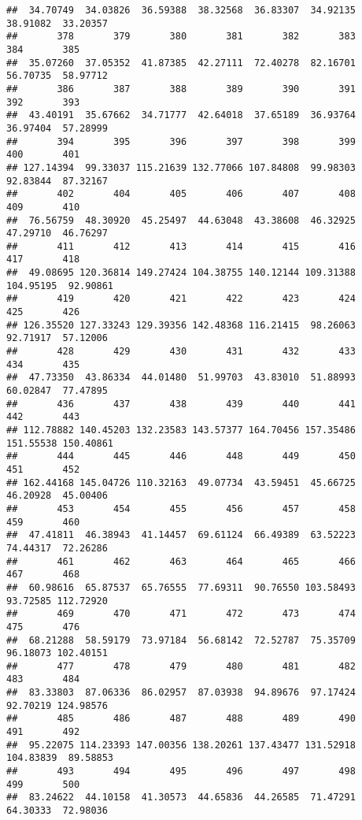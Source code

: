 \documentclass[
]{article}
\begin{document}
\begin{verbatim}
##  34.70749  34.03826  36.59388  38.32568  36.83307  34.92135  38.91082  33.20357 
##       378       379       380       381       382       383       384       385 
##  35.07260  37.05352  41.87385  42.27111  72.40278  82.16701  56.70735  58.97712 
##       386       387       388       389       390       391       392       393 
##  43.40191  35.67662  34.71777  42.64018  37.65189  36.93764  36.97404  57.28999 
##       394       395       396       397       398       399       400       401 
## 127.14394  99.33037 115.21639 132.77066 107.84808  99.98303  92.83844  87.32167 
##       402       404       405       406       407       408       409       410 
##  76.56759  48.30920  45.25497  44.63048  43.38608  46.32925  47.29710  46.76297 
##       411       412       413       414       415       416       417       418 
##  49.08695 120.36814 149.27424 104.38755 140.12144 109.31388 104.95195  92.90861 
##       419       420       421       422       423       424       425       426 
## 126.35520 127.33243 129.39356 142.48368 116.21415  98.26063  92.71917  57.12006 
##       428       429       430       431       432       433       434       435 
##  47.73350  43.86334  44.01480  51.99703  43.83010  51.88993  60.02847  77.47895 
##       436       437       438       439       440       441       442       443 
## 112.78882 140.45203 132.23583 143.57377 164.70456 157.35486 151.55538 150.40861 
##       444       445       446       448       449       450       451       452 
## 162.44168 145.04726 110.32163  49.07734  43.59451  45.66725  46.20928  45.00406 
##       453       454       455       456       457       458       459       460 
##  47.41811  46.38943  41.14457  69.61124  66.49389  63.52223  74.44317  72.26286 
##       461       462       463       464       465       466       467       468 
##  60.98616  65.87537  65.76555  77.69311  90.76550 103.58493  93.72585 112.72920 
##       469       470       471       472       473       474       475       476 
##  68.21288  58.59179  73.97184  56.68142  72.52787  75.35709  96.18073 102.40151 
##       477       478       479       480       481       482       483       484 
##  83.33803  87.06336  86.02957  87.03938  94.89676  97.17424  92.70219 124.98576 
##       485       486       487       488       489       490       491       492 
##  95.22075 114.23393 147.00356 138.20261 137.43477 131.52918 104.83839  89.58853 
##       493       494       495       496       497       498       499       500 
##  83.24622  44.10158  41.30573  44.65836  44.26585  71.47291  64.30333  72.98036 

\end{verbatim}
\end{document}
